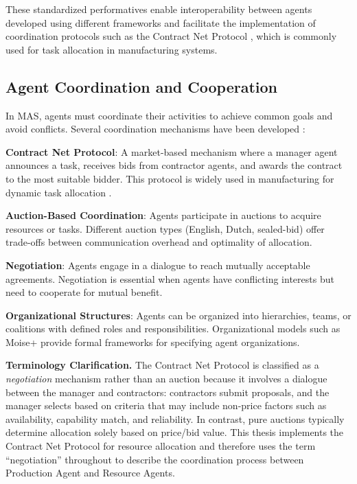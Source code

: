These standardized performatives enable interoperability between agents developed using different frameworks and facilitate the implementation of coordination protocols such as the Contract Net Protocol \cite{smith1980contract}, which is commonly used for task allocation in manufacturing systems.

\subsection{Agent Coordination and Cooperation}
\label{subsec:agent_coordination}

In \ac{MAS}, agents must coordinate their activities to achieve common goals and avoid conflicts. Several coordination mechanisms have been developed \cite{wooldridge2009introduction}:

\textbf{Contract Net Protocol}: A market-based mechanism where a manager agent announces a task, receives bids from contractor agents, and awards the contract to the most suitable bidder. This protocol is widely used in manufacturing for dynamic task allocation \cite{smith1980contract}.

\textbf{Auction-Based Coordination}: Agents participate in auctions to acquire resources or tasks. Different auction types (English, Dutch, sealed-bid) offer trade-offs between communication overhead and optimality of allocation.

\textbf{Negotiation}: Agents engage in a dialogue to reach mutually acceptable agreements. Negotiation is essential when agents have conflicting interests but need to cooperate for mutual benefit.

\textbf{Organizational Structures}: Agents can be organized into hierarchies, teams, or coalitions with defined roles and responsibilities. Organizational models such as Moise+ \cite{hubner2007moise} provide formal frameworks for specifying agent organizations.

\textbf{Terminology Clarification.} The Contract Net Protocol is classified as a \textit{negotiation} mechanism rather than an auction because it involves a dialogue between the manager and contractors: contractors submit proposals, and the manager selects based on criteria that may include non-price factors such as availability, capability match, and reliability. In contrast, pure auctions typically determine allocation solely based on price/bid value. This thesis implements the Contract Net Protocol for resource allocation and therefore uses the term ``negotiation'' throughout to describe the coordination process between Production Agent and Resource Agents.

